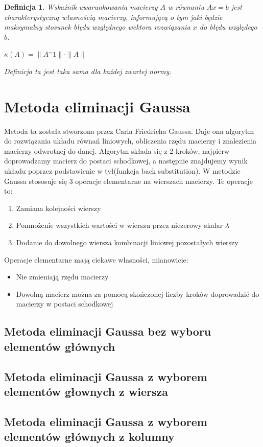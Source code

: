 \documentclass[a4paper,10pt]{article}
\newtheorem{definition}{Definicja}
\begin{document}
\begin{definition}
    Wskaźnik uwarunkowania macierzy $A$ w równaniu $Ax = b$ jest charakterystyczną własnością macierzy, informującą o tym jaki będzie maksymalny stosunek błędu względnego wektora rozwiązania $x$ do błędu względego $b$.
    \begin{center}
        $ \kappa(A) = \|A^-1\| \cdot \|A\|$
    \end{center}
    Definicja ta jest taka sama dla każdej zwartej normy.
\end{definition}

\section{Metoda eliminacji Gaussa}
	Metoda ta została stworzona przez Carla Friedricha Gaussa. Daje ona algorytm do rozwiązania układu równań liniowych,
	obliczenia rzędu macierzy i znalezienia macierzy odwrotnej do danej. Algorytm składa się z 2 kroków, najpierw doprowadzamy
	macierz do postaci schodkowej, a następnie znajdujemy wynik układu poprzez podstawienie w tył(funkcja back substitution).
	W metodzie Gaussa stososuje się 3 operacje elementarne na wierszach macierzy. Te operacje to:
	\begin{enumerate}
		\item Zamiana kolejności wierszy
		\item Pomnożenie wszystkich wartości w wierszu przez niezerowy skalar $\lambda$
		\item Dodanie do dowolnego wiersza kombinacji liniowej pozostałych wierszy
	\end{enumerate}
	Operacje elementarne mają ciekawe własności, mianowicie:
	\begin{itemize}
		\item Nie zmieniają rzędu macierzy
		\item Dowolną macierz można za pomocą skończonej liczby kroków doprowadzić do macierzy w postaci schodkowej
	\end{itemize}
	\subsection{Metoda eliminacji Gaussa bez wyboru elementów głównych}%
    \subsection{Metoda eliminacji Gaussa z wyborem elementów głownych z wiersza}%
    \subsection{Metoda eliminacji Gaussa z wyborem elementów głównych z kolumny}%
\end{document}
